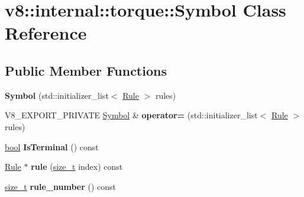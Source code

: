 \hypertarget{classv8_1_1internal_1_1torque_1_1Symbol}{}\section{v8\+:\+:internal\+:\+:torque\+:\+:Symbol Class Reference}
\label{classv8_1_1internal_1_1torque_1_1Symbol}
\subsection*{Public Member Functions}
\begin{DoxyCompactItemize}
\item 
\mbox{\label{classv8_1_1internal_1_1torque_1_1Symbol_accf74aab60a719c139f360bcfec61c4e}} 
{\bfseries Symbol} (std\+::initializer\+\_\+list$<$ \mbox{\hyperlink{classv8_1_1internal_1_1torque_1_1Rule}{Rule}} $>$ rules)
\item 
\mbox{\label{classv8_1_1internal_1_1torque_1_1Symbol_ab17f4836195f44267699e932fcbca957}} 
V8\+\_\+\+E\+X\+P\+O\+R\+T\+\_\+\+P\+R\+I\+V\+A\+TE \mbox{\hyperlink{classv8_1_1internal_1_1torque_1_1Symbol}{Symbol}} \& {\bfseries operator=} (std\+::initializer\+\_\+list$<$ \mbox{\hyperlink{classv8_1_1internal_1_1torque_1_1Rule}{Rule}} $>$ rules)
\item 
\mbox{\label{classv8_1_1internal_1_1torque_1_1Symbol_a01f3e73c20c2dc0e9660f7601cd0bab3}} 
\mbox{\hyperlink{classbool}{bool}} {\bfseries Is\+Terminal} () const
\item 
\mbox{\label{classv8_1_1internal_1_1torque_1_1Symbol_aae85194b81a8bff81bc29d9f02231641}} 
\mbox{\hyperlink{classv8_1_1internal_1_1torque_1_1Rule}{Rule}} $\ast$ {\bfseries rule} (\mbox{\hyperlink{classsize__t}{size\+\_\+t}} index) const
\item 
\mbox{\label{classv8_1_1internal_1_1torque_1_1Symbol_a71ae8189492b69034585039e84dbd703}} 
\mbox{\hyperlink{classsize__t}{size\+\_\+t}} {\bfseries rule\+\_\+number} () const
\item 
\mbox{\label{classv8_1_1internal_1_1torque_1_1Symbol_af765158afba19428ea43ba4fce046051}} 

\end{DoxyCompactItemize}
